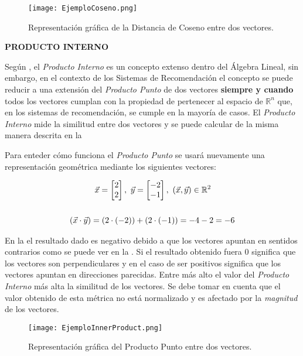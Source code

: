     \begin{figure}[h!]
        \centering
        \texttt{[image: EjemploCoseno.png]}
        \caption{Representación gráfica de la Distancia de Coseno entre dos vectores.}
        \label{fig: EjemploCoseno}
    \end{figure}

    \textbf{PRODUCTO INTERNO}

    Según \parencite{libretexts-2024}, el \textit{Producto Interno} es un concepto extenso dentro del Álgebra Lineal, sin embargo, en el contexto de los Sistemas de Recomendación el concepto se puede reducir a una extensión del \textit{Producto Punto} de dos vectores \textbf{siempre y cuando} todos los vectores cumplan con la propiedad de pertenecer al espacio de $\mathbb{R}^n$ que, en los sistemas de recomendación, se cumple en la mayoría de casos. El \textit{Producto Interno} mide la similitud entre dos vectores y se puede calcular de la misma manera descrita en la 

    \newpage

    Para enteder cómo funciona el \textit{Producto Punto} se usará nuevamente una representación geométrica mediante los siguientes vectores:

    \begin{equation}
        \begin{split}
            \vec{x} = \begin{bmatrix}
                2
                \\
                2
            \end{bmatrix}, \
            \vec{y} &= \begin{bmatrix}
                -2
                \\
                -1
            \end{bmatrix}, \
            (\vec{x}, \vec{y}) \in \mathbb{R}^2
            \\
            \\
            (\vec{x} \cdot \vec{y}) = (2 \cdot (-2)) &+ (2 \cdot (-1)) = -4 - 2 = -6
        \end{split}
        \addequation{Ejemplo de Producto Interno}
        \label{eq:EjProductoInterno}
    \end{equation}

    En la  el resultado dado es negativo debido a que los vectores apuntan en sentidos contrarios como se puede ver en la . Si el resultado obtenido fuera 0 significa que los vectores son perpendiculares y en el caso de ser positivos significa que los vectores apuntan en direcciones parecidas. Entre más alto el valor del \textit{Producto Interno} más alta la similitud de los vectores. Se debe tomar en cuenta que el valor obtenido de esta métrica no está normalizado y es afectado por la \textit{magnitud} de los vectores.

    \begin{figure}[h!]
        \centering
        \texttt{[image: EjemploInnerProduct.png]}
        \caption{Representación gráfica del Producto Punto entre dos vectores.}
        \label{fig: EjemploInner}
    \end{figure}


    \newpage

    





    